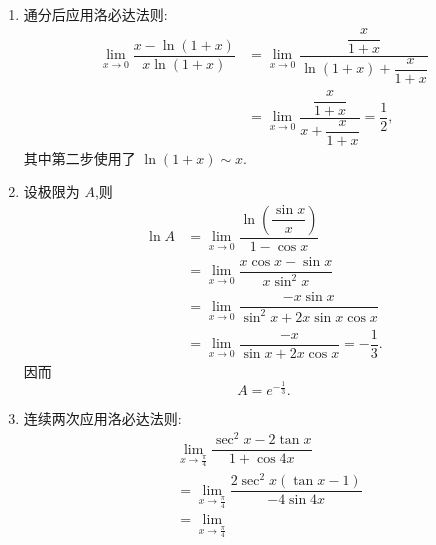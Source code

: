 \begin{solution}
    \leavevmode
    \begin{enumerate}
        \item 通分后应用洛必达法则:
              \[
                  \begin{aligned}
                      \lim\limits_{x\to0}
                      \dfrac{x-\ln(1+x)}{x\ln(1+x)}
                       & =
                      \lim\limits_{x\to0}
                      \dfrac{\dfrac{x}{1+x}}
                      {\ln(1+x)+\dfrac{x}{1+x}} \\
                       & =
                      \lim\limits_{x\to0}
                      \dfrac{\dfrac{x}{1+x}}
                      {x+\dfrac{x}{1+x}}
                      =\dfrac{1}{2},
                  \end{aligned}
              \]
              其中第二步使用了 $\ln(1+x)\sim x$.
        \item 设极限为 $A$,则
              \[
                  \begin{aligned}
                      \ln A
                       & =
                      \lim\limits_{x\to0}
                      \dfrac{\ln\left(\dfrac{\sin x}{x}\right)}{1-\cos x} \\
                       & =
                      \lim\limits_{x\to0}
                      \dfrac{x\cos x-\sin x}{x\sin^2x}                    \\
                       & =
                      \lim\limits_{x\to0}
                      \dfrac{-x\sin x}{\sin^2x+2x\sin x\cos x}            \\
                       & =
                      \lim\limits_{x\to0}
                      \dfrac{-x}{\sin x+2x\cos x}
                      =-\dfrac{1}{3}.
                  \end{aligned}
              \]
              因而
              \[
                  A=e^{-\frac{1}{3}}.
              \]
        \item 连续两次应用洛必达法则:
              \[
                  \begin{aligned}
                       & \lim\limits_{x\to\frac{\pi}{4}}
                      \dfrac{\sec^2x-2\tan x}{1+\cos4x}    \\
                       & =
                      \lim\limits_{x\to\frac{\pi}{4}}
                      \dfrac{2\sec^2x(\tan x-1)}{-4\sin4x} \\
                       & =
                      \lim\limits_{x\to\frac{\pi}{4}}

\end{aligned}\]
\end{enumerate}
\end{solution}
